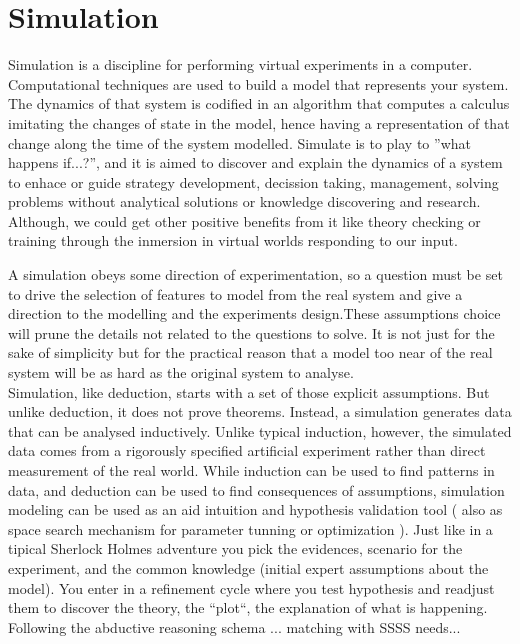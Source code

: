 \documentclass{report}
\begin{document}
\section{Simulation}

Simulation is a discipline for performing virtual experiments in a computer. Computational techniques are used to build a model that represents your system. The dynamics of that system is codified in an algorithm that computes a calculus imitating the changes of state in the model, hence having a representation of that change along the time of the system modelled. Simulate is to play to ''what happens if...?'', and it is aimed to discover and explain the dynamics of a system to enhace or guide strategy development, decission taking, management, solving problems without analytical solutions or knowledge discovering and research. Although, we could get other positive benefits from it like theory checking or training through the inmersion in virtual worlds responding to our input.

A simulation obeys some direction of experimentation, so a question must be set to drive the selection of features to model from the real system and give a direction to the modelling and the experiments design.These assumptions choice will prune the details not related to the questions to solve. It is not just for the sake of simplicity but for the practical reason that a model too near of the real system will be as hard as the original system to analyse.\\
Simulation, like deduction, starts with a set of those explicit assumptions. But unlike deduction, it does not prove theorems. Instead, a simulation generates data that can be analysed inductively. Unlike typical induction, however, the simulated data comes from a rigorously specified artificial experiment rather than direct measurement of the real world. While induction can be used to find patterns in data, and deduction can be used to find consequences of assumptions, simulation modeling can be used as an aid intuition and hypothesis validation tool ( also as space search mechanism for parameter tunning or optimization ).
Just like in a tipical Sherlock Holmes adventure you pick the evidences, scenario for the experiment, and the common knowledge (initial expert assumptions about the model). You enter in a refinement cycle where you test hypothesis and readjust them to discover the theory, the ``plot``, the explanation of what is happening. Following the abductive reasoning schema ... matching with SSSS needs...
\end{document}
